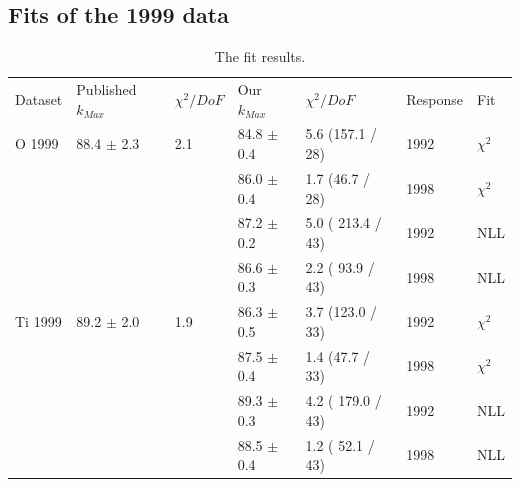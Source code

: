 \subsection { Fits of the 1999 data }

\begin{table}[h]
  \begin{center}
    \begin{tabular}{|l||l|l|l|l|l|l|}
      \hline
      Dataset & Published $k_{Max}$ & $\chi^2 / DoF$ & Our $k_{Max}$ & $\chi^2 / DoF$  & Response & Fit \\
      \hhline{|=||=|=|=|=|=|=|}
       O 1999    & 88.4 $\pm$ 2.3 & 2.1 & 84.8 $\pm$ 0.4 &  5.6 (157.1 / 28)& 1992 & $\chi^2$ \\  
                 &                &     & 86.0 $\pm$ 0.4 &  1.7 (46.7 / 28) & 1998 & $\chi^2$ \\  
                                                                             
                 &                &     & 87.2 $\pm$ 0.2 & 5.0 ( 213.4 / 43)& 1992 & NLL\\
                 &                &     & 86.6 $\pm$ 0.3 & 2.2 ( 93.9 / 43) & 1998 & NLL\\
      \hline                                                                 
       Ti 1999   & 89.2 $\pm$ 2.0 & 1.9 & 86.3 $\pm$ 0.5 &  3.7 (123.0 / 33)& 1992 & $\chi^2$ \\  
                 &                &     & 87.5 $\pm$ 0.4 &  1.4 (47.7 / 33) & 1998 & $\chi^2$ \\  
                                                                             
                 &                &     & 89.3 $\pm$ 0.3 & 4.2 ( 179.0 / 43) & 1992 & NLL \\
                 &                &     & 88.5 $\pm$ 0.4 & 1.2 ( 52.1 / 43) & 1998 & NLL \\
      \hline                           
    \end{tabular}
  \end{center}
  \caption{The fit results.}
  \label{table:fits1999}
\end{table}



